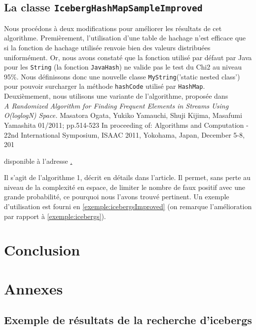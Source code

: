 \documentclass[12pt,a4paper,titlepage]{article}
\newcommand{\class}[1]{\texttt{#1}}
\begin{document}
\subsection{La classe \class{IcebergHashMapSampleImproved}}

Nous procédons à deux modifications pour améliorer les résultats de cet algorithme. Premièrement, l'utilisation d'une table de hachage n'est efficace que si la fonction de hachage utilisée renvoie bien des valeurs distribuées uniformément. Or, nous avons constaté que la fonction utilisé par défaut par Java pour les \class{String} (la fonction \class{JavaHash}) ne valide pas le test du Chi2 au niveau 95\%. Nous définissons donc une nouvelle classe \class{MyString}('static nested class') pour pouvoir surcharger la méthode \class{hashCode} utilisé par \class{HashMap}.\\

Deuxièmement, nous utilisons une variante de l'algorithme, proposée dans\\

\textit{A Randomized Algorithm for Finding Frequent Elements in Streams Using O(loglogN) Space.}
Masatora Ogata, Yukiko Yamauchi, Shuji Kijima, Masafumi Yamashita
01/2011; pp.514-523 In proceeding of: Algorithms and Computation - 22nd International Symposium, ISAAC 2011, Yokohama, Japan, December 5-8, 201

\noindent disponible à l'adresse
\href{http://www.google.fr/search?tbo=p&tbm=bks&q=isbn:3642255906}.


\noindent Il s'agit de l'algorithme 1, décrit en détails dans l'article. Il permet, sans perte au niveau de la complexité en espace, de limiter le nombre de faux positif avec une grande probabilité, ce pourquoi nous l'avons trouvé pertinent. Un exemple d'utilisation est fourni en \ref{exemple:icebergsImproved} (on remarque l'amélioration par rapport à \ref{exemple:icebergs}).

\newpage
\section*{Conclusion}


\newpage
\section*{Annexes}
 
\subsection*{Exemple de résultats de la recherche d'icebergs}
\label{exemple:icebergs}
\end{document}
